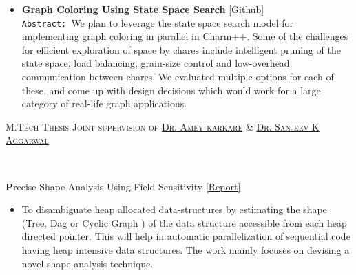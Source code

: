 \documentclass[9pt]{article}
\newenvironment{changemargin}[2]{%
  \begin{list}{}{%
    \setlength{\topsep}{0pt}%
    \setlength{\leftmargin}{#1}%
    \setlength{\rightmargin}{#2}%
    \setlength{\listparindent}{\parindent}%
    \setlength{\itemindent}{\parindent}%
    \setlength{\parsep}{\parskip}%
  }%
  \item[]}{\end{list}
}
\newcommand{\lineover}{
	\begin{changemargin}{-0.05in}{-0.05in}
		\vspace*{-8pt}
		\hrulefill \\
		\vspace*{-2pt}
	\end{changemargin}
}
\newcommand{\header}[1]{
	\begin{changemargin}{-0.5in}{-0.5in}
		\scshape{#1}\\
  	\lineover
	\end{changemargin}
}
\newenvironment{body} {
	\vspace*{-16pt}
	\begin{changemargin}{-0.25in}{-0.5in}
  }	
	{\end{changemargin}
}
\begin{document}
\begin{body}
\begin{itemize}
           \item \textbf{Graph Coloring Using State Space Search} \href{https://github.com/sdasgup3/ParallelSudoku}{[Github]} \\          
                                  \texttt{Abstract: }We plan to leverage the state space
                                  search model for implementing graph coloring
                                  in parallel in Charm++. Some of the
                                  challenges for efficient exploration of space
                                  by chares include intelligent pruning of the
                                  state space, load balancing, grain-size
                                  control and low-overhead communication
                                  between chares. We evaluated multiple options
                                  for each of these, and come up with design
                                  decisions which would work for a large
                                  category of real-life graph applications.
	\end{itemize}
\end{body}

\smallskip

\header{M.Tech Thesis \hfill Joint supervision of \href{http://www.cse.iitk.ac.in/users/karkare/}{Dr. Amey karkare} \& \href{http://www.cse.iitk.ac.in/users/ska/}{Dr.  Sanjeev K Aggarwal} }

\begin{body}
	\vspace{14pt}
	\textbf Precise Shape Analysis Using Field Sensitivity {\href{http://www.cse.iitk.ac.in/users/karkare/MTP/2010-11/sandeep2010precise.pdf}{[Report]}} \\
		\begin{itemize} \itemsep -0pt  
		\item[] To disambiguate heap allocated data-structures by estimating the shape (Tree, Dag or Cyclic Graph ) of the data structure 
			accessible from each heap directed pointer. This will help in automatic parallelization of sequential code having heap 
			intensive data structures. The work mainly focuses on devising a novel shape analysis technique. 
		\end{itemize}
\end{body}

\smallskip
\end{document}
